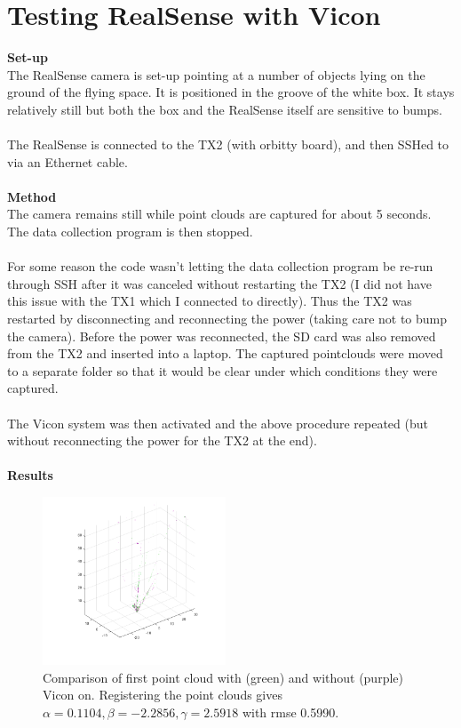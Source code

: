 \documentclass[12pt,a4paper]{article}
\begin{document}
\section{Testing RealSense with Vicon}
\textbf{Set-up} \\
The RealSense camera is set-up pointing at a number of objects lying on the ground of the flying space. It is positioned in the groove of the white box. It stays relatively still but both the box and the RealSense itself are sensitive to bumps.
\\\\
The RealSense is connected to the TX2 (with orbitty board), and then SSHed to via an Ethernet cable. 
\\\\
\textbf{Method} \\
The camera remains still while point clouds are captured for about 5 seconds. The data collection program is then stopped. 
\\\\
For some reason the code wasn't letting the data collection program be re-run through SSH after it was canceled without restarting the TX2 (I did not have this issue with the TX1 which I connected to directly). Thus the TX2 was restarted by disconnecting and reconnecting the power (taking care not to bump the camera). Before the power was reconnected, the SD card was also removed from the TX2 and inserted into a laptop. The captured pointclouds were moved to a separate folder so that it would be clear under which conditions they were captured.
\\\\
The Vicon system was then activated and the above procedure repeated (but without reconnecting the power for the TX2 at the end).
\\\\
\textbf{Results} \\
	\begin{figure}[h]
		\centering
		\includegraphics[height=50mm, trim = 20mm 20mm 20mm 20mm, clip]{first_frame_compare.png}
		\caption{Comparison of first point cloud with (green) and without (purple) Vicon on. Registering the point clouds gives $\alpha = 0.1104, \beta = -2.2856, \gamma = 2.5918$ with rmse 0.5990.}
		\label{f: vicon first frame}
	\end{figure}
\end{document}
